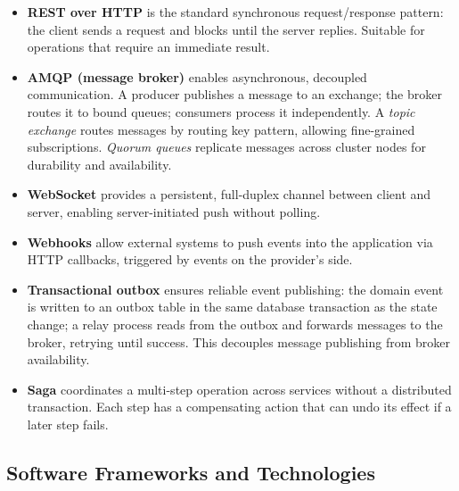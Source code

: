 \begin{itemize}
  \item \textbf{REST over HTTP} is the standard synchronous request/response pattern: the client sends a request and blocks until the server replies. Suitable for operations that require an immediate result.

  \item \textbf{AMQP (message broker)} enables asynchronous, decoupled communication. A producer publishes a message to an exchange; the broker routes it to bound queues; consumers process it independently. A \textit{topic exchange} routes messages by routing key pattern, allowing fine-grained subscriptions. \textit{Quorum queues} replicate messages across cluster nodes for durability and availability.

  \item \textbf{WebSocket} provides a persistent, full-duplex channel between client and server, enabling server-initiated push without polling.

  \item \textbf{Webhooks} allow external systems to push events into the application via HTTP callbacks, triggered by events on the provider's side.

  \item \textbf{Transactional outbox} ensures reliable event publishing: the domain event is written to an outbox table in the same database transaction as the state change; a relay process reads from the outbox and forwards messages to the broker, retrying until success. This decouples message publishing from broker availability.

  \item \textbf{Saga} coordinates a multi-step operation across services without a distributed transaction. Each step has a compensating action that can undo its effect if a later step fails.
\end{itemize}

\subsection{Software Frameworks and Technologies}

